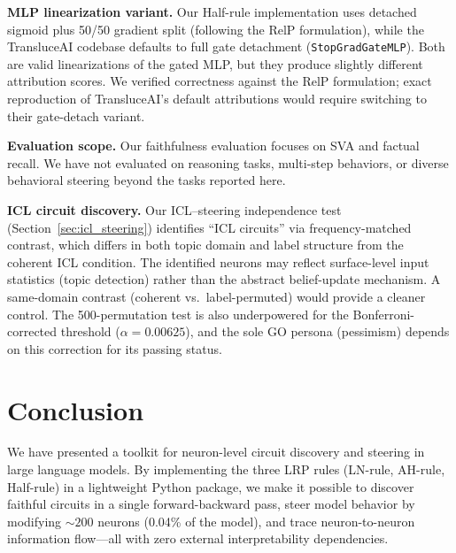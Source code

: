 \documentclass[11pt]{article}
\begin{document}
\textbf{MLP linearization variant.}
Our Half-rule implementation uses detached sigmoid plus 50/50 gradient split (following the RelP formulation), while the TransluceAI codebase defaults to full gate detachment (\texttt{StopGradGateMLP}).
Both are valid linearizations of the gated MLP, but they produce slightly different attribution scores.
We verified correctness against the RelP formulation; exact reproduction of TransluceAI's default attributions would require switching to their gate-detach variant.

\textbf{Evaluation scope.}
Our faithfulness evaluation focuses on SVA and factual recall.
We have not evaluated on reasoning tasks, multi-step behaviors, or diverse behavioral steering beyond the tasks reported here.

\textbf{ICL circuit discovery.}
Our ICL--steering independence test (Section~\ref{sec:icl_steering}) identifies ``ICL circuits'' via frequency-matched contrast, which differs in both topic domain and label structure from the coherent ICL condition.
The identified neurons may reflect surface-level input statistics (topic detection) rather than the abstract belief-update mechanism.
A same-domain contrast (coherent vs.\ label-permuted) would provide a cleaner control.
The 500-permutation test is also underpowered for the Bonferroni-corrected threshold ($\alpha = 0.00625$), and the sole GO persona (pessimism) depends on this correction for its passing status.


\section{Conclusion}
\label{sec:conclusion}

We have presented a toolkit for neuron-level circuit discovery and steering in large language models.
By implementing the three LRP rules (LN-rule, AH-rule, Half-rule) in a lightweight Python package, we make it possible to discover faithful circuits in a single forward-backward pass, steer model behavior by modifying ${\sim}200$ neurons (0.04\% of the model), and trace neuron-to-neuron information flow---all with zero external interpretability dependencies.
\end{document}
